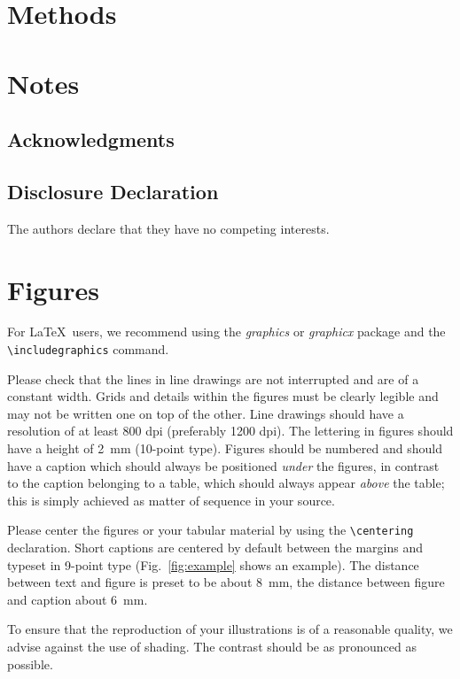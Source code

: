\documentclass[runningheads,a4paper]{llncs}
\begin{document}
\begin{linenumbers}
\section{Methods}

\section{Notes}

\subsection*{Acknowledgments}

\subsection*{Disclosure Declaration}
The authors declare that they have no competing interests.
\end{linenumbers}

\section{Figures}

For \LaTeX\ users, we recommend using the \emph{graphics} or \emph{graphicx}
package and the \verb+\includegraphics+ command.

Please check that the lines in line drawings are not
interrupted and are of a constant width. Grids and details within the
figures must be clearly legible and may not be written one on top of
the other. Line drawings should have a resolution of at least 800 dpi
(preferably 1200 dpi). The lettering in figures should have a height of
2~mm (10-point type). Figures should be numbered and should have a
caption which should always be positioned \emph{under} the figures, in
contrast to the caption belonging to a table, which should always appear
\emph{above} the table; this is simply achieved as matter of sequence in
your source.

Please center the figures or your tabular material by using the \verb+\centering+
declaration. Short captions are centered by default between the margins
and typeset in 9-point type (Fig.~\ref{fig:example} shows an example).
The distance between text and figure is preset to be about 8~mm, the
distance between figure and caption about 6~mm.

To ensure that the reproduction of your illustrations is of a reasonable
quality, we advise against the use of shading. The contrast should be as
pronounced as possible.
\end{document}
